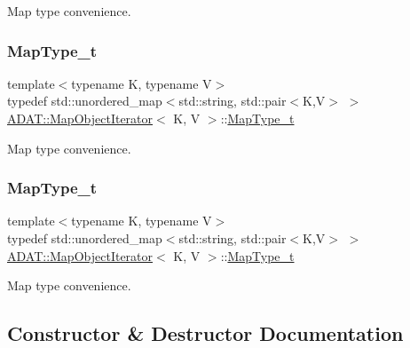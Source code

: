 Map type convenience. 

\mbox{\label{classADAT_1_1MapObjectIterator_ad159a70384669e35c10ddb298c4d1ba8}} 
\subsubsection{\texorpdfstring{MapType\_t}{MapType\_t}\hspace{0.1cm}{\footnotesize\ttfamily [2/3]}}
{\footnotesize\ttfamily template$<$typename K, typename V$>$ \\
typedef std\+::unordered\+\_\+map$<$std\+::string, std\+::pair$<$K,V$>$ $>$ \mbox{\hyperlink{classADAT_1_1MapObjectIterator}{A\+D\+A\+T\+::\+Map\+Object\+Iterator}}$<$ K, V $>$\+::\mbox{\hyperlink{classADAT_1_1MapObjectIterator_ad159a70384669e35c10ddb298c4d1ba8}{Map\+Type\+\_\+t}}}



Map type convenience. 

\mbox{\label{classADAT_1_1MapObjectIterator_ad159a70384669e35c10ddb298c4d1ba8}} 
\subsubsection{\texorpdfstring{MapType\_t}{MapType\_t}\hspace{0.1cm}{\footnotesize\ttfamily [3/3]}}
{\footnotesize\ttfamily template$<$typename K, typename V$>$ \\
typedef std\+::unordered\+\_\+map$<$std\+::string, std\+::pair$<$K,V$>$ $>$ \mbox{\hyperlink{classADAT_1_1MapObjectIterator}{A\+D\+A\+T\+::\+Map\+Object\+Iterator}}$<$ K, V $>$\+::\mbox{\hyperlink{classADAT_1_1MapObjectIterator_ad159a70384669e35c10ddb298c4d1ba8}{Map\+Type\+\_\+t}}}



Map type convenience. 



\subsection{Constructor \& Destructor Documentation}
\mbox{\label{classADAT_1_1MapObjectIterator_a2b23220f6791a2793bb16a898a515926}} 

